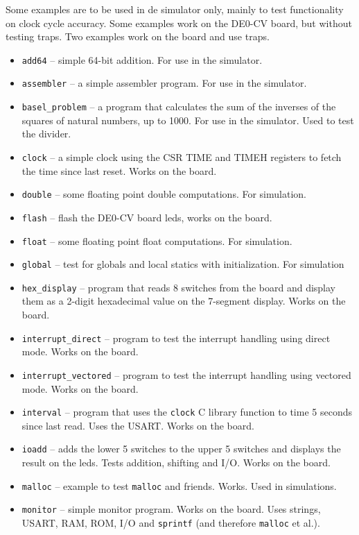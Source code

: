 \documentclass[12pt]{article}
\begin{document}
Some examples are to be used in de simulator only, mainly to test functionality on clock cycle accuracy. Some examples work on the DE0-CV board, but without testing traps. Two examples work on the board and use traps.

\begin{itemize}
\item \texttt{add64} -- simple 64-bit addition. For use in the simulator.
\item \texttt{assembler} -- a simple assembler program. For use in the simulator.
\item \texttt{basel\_problem} -- a program that calculates the sum of the inverses of the squares of natural numbers, up to 1000. For use in the simulator. Used to test the divider.
\item \texttt{clock} -- a simple clock using the CSR TIME and TIMEH registers to fetch the time since last reset. Works on the board.
\item \texttt{double} -- some floating point double computations. For simulation.
\item \texttt{flash} -- flash the DE0-CV board leds, works on the board.
\item \texttt{float} -- some floating point float computations. For simulation.
\item \texttt{global} -- test for globals and local statics with initialization. For simulation
\item \texttt{hex\_display} -- program that reads 8 switches from the board and display them as a 2-digit hexadecimal value on the 7-segment display. Works on the board.
\item \texttt{interrupt\_direct} -- program to test the interrupt handling using direct mode. Works on the board.
\item \texttt{interrupt\_vectored} -- program to test the interrupt handling using vectored mode. Works on the board.
\item \texttt{interval} -- program that uses the \texttt{clock} C library function to time 5 seconds since last read. Uses the USART. Works on the board.
\item \texttt{ioadd} -- adds the lower 5 switches to the upper 5 switches and displays the result on the leds. Tests addition, shifting and I/O. Works on the board.
\item \texttt{malloc} -- example to test \texttt{malloc} and friends. Works. Used in simulations.
\item \texttt{monitor} -- simple monitor program. Works on the board. Uses strings, USART, RAM, ROM, I/O and \texttt{sprintf} (and therefore \texttt{malloc} et al.).

\end{itemize}
\end{document}
